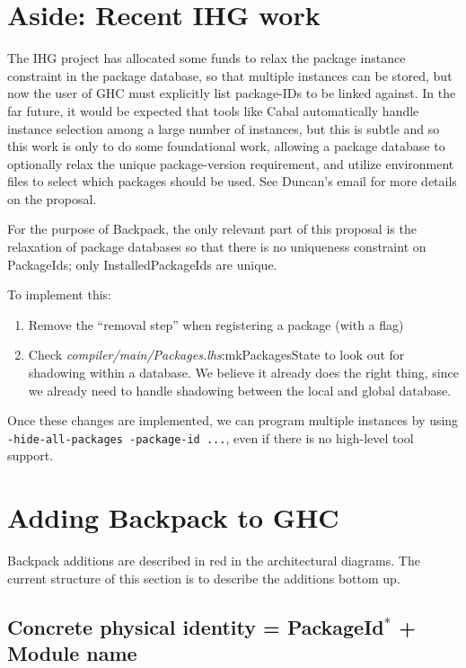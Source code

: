 \documentclass{article}
\newcommand{\ghcfile}[1]{\textsl{#1}}
\begin{document}
\section{Aside: Recent IHG work}\label{sec:ihg}

The IHG project has allocated some funds to relax the package instance
constraint in the package database, so that multiple instances can be
stored, but now the user of GHC must explicitly list package-IDs to be
linked against.  In the far future, it would be expected that tools like
Cabal automatically handle instance selection among a large number of
instances, but this is subtle and so this work is only to do some
foundational work, allowing a package database to optionally relax the
unique package-version requirement, and utilize environment files to
select which packages should be used.  See Duncan's email for more
details on the proposal.

For the purpose of Backpack, the only relevant part of this proposal
is the relaxation of package databases so that there is no uniqueness
constraint on PackageIds; only InstalledPackageIds are unique.

To implement this:

\begin{enumerate}

    \item Remove the ``removal step'' when registering a package (with a flag)

    \item Check \ghcfile{compiler/main/Packages.lhs}:mkPackagesState to look out for shadowing
      within a database. We believe it already does the right thing, since
      we already need to handle shadowing between the local and global database.

\end{enumerate}

Once these changes are implemented, we can program multiple instances by
using \verb|-hide-all-packages -package-id ...|, even if there is no
high-level tool support.

\section{Adding Backpack to GHC}

Backpack additions are described in red in the architectural diagrams.
The current structure of this section is to describe the additions bottom up.

\subsection{Concrete physical identity = PackageId$^*$ + Module name}\label{sec:ipi}
\end{document}
